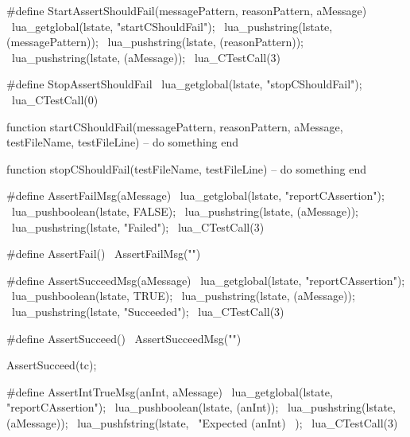 
\startCHeader
#define StartAssertShouldFail(messagePattern, reasonPattern, aMessage) \
  lua_getglobal(lstate, "startCShouldFail");                           \
  lua_pushstring(lstate, (messagePattern));                            \
  lua_pushstring(lstate, (reasonPattern));                             \
  lua_pushstring(lstate, (aMessage));                                  \
  lua_CTestCall(3)

#define StopAssertShouldFail                \
  lua_getglobal(lstate, "stopCShouldFail"); \
  lua_CTestCall(0)
\stopCHeader

\startLuaCode
function startCShouldFail(messagePattern, reasonPattern, aMessage, testFileName, testFileLine)
  -- do something
end

function stopCShouldFail(testFileName, testFileLine)
  -- do something
end
\stopLuaCode

\stopTestSuite

\startTestSuite[assertFail]

\startCHeader
#define AssertFailMsg(aMessage)              \
  lua_getglobal(lstate, "reportCAssertion"); \
  lua_pushboolean(lstate, FALSE);            \
  lua_pushstring(lstate, (aMessage));        \
  lua_pushstring(lstate, "Failed");          \
  lua_CTestCall(3)
  
#define AssertFail() \
  AssertFailMsg("")
\stopCHeader

\stopTestSuite

\startTestSuite[assertSucceed]

\startCHeader
#define AssertSucceedMsg(aMessage)           \
  lua_getglobal(lstate, "reportCAssertion"); \
  lua_pushboolean(lstate, TRUE);             \
  lua_pushstring(lstate, (aMessage));        \
  lua_pushstring(lstate, "Succeeded");       \
  lua_CTestCall(3)

#define AssertSucceed() \
  AssertSucceedMsg("")
\stopCHeader


\startCTest
  AssertSucceed(tc);
\stopCTest
\stopTestCase

\stopTestSuite

\startTestSuite[assertIntTrue]

\startCHeader
#define AssertIntTrueMsg(anInt, aMessage)    \
  lua_getglobal(lstate, "reportCAssertion"); \
  lua_pushboolean(lstate, (anInt));          \
  lua_pushstring(lstate, (aMessage));        \
  lua_pushfstring(lstate,                    \
      "Expected %
      (anInt)                                \
    );                                       \
  lua_CTestCall(3)

